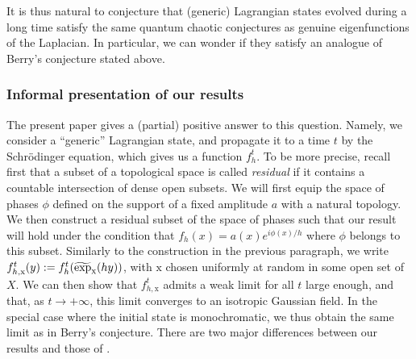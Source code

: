 \documentclass[10pt]{amsart}
\theoremstyle{plain}
\theoremstyle{definition}
\begin{document}
It is thus natural to conjecture that (generic) Lagrangian states evolved during a long time satisfy the same quantum chaotic conjectures as genuine eigenfunctions of the Laplacian. In particular, we can wonder if they satisfy an analogue of Berry's conjecture stated above.\enlargethispage{1.2\baselineskip}%

\subsubsection*{Informal presentation of our results}
The present paper gives a (partial) positive answer to this question. Namely, we consider a ``generic'' Lagrangian state, and propagate it to a time $t$ by the Schrödinger equation, which gives us a function $f_h^t$. To be more precise, recall first that a subset of a topological space is called \emph{residual} if it contains a countable intersection of dense open subsets. We will first equip the space of phases $\phi$ defined on the support of a fixed amplitude $a$ with a natural topology. We then construct a residual subset of the space of phases such that our result will hold under the condition that $f_h(x)=a(x)e^{i\phi(x)/h}$ where $\phi$ belongs to this subset. Similarly to the construction in the previous paragraph, we write $f_{h,\mathrm{x}}^t(y):= f^t_h(\widetilde{\exp}_{\textsc{x}}(hy))$, with $\mathrm{x}$ chosen uniformly at random in some open set of $X$. We can then show that $f_{h,\mathrm{x}}^t$ admits a weak limit for all $t$ large enough, and that, as $t\to +\infty$, this limit converges to an isotropic Gaussian field. In the special case where the initial state is monochromatic, we thus obtain the same limit as in Berry's conjecture. There are two major differences between our results and those of \cite{Schu}.
\end{document}
